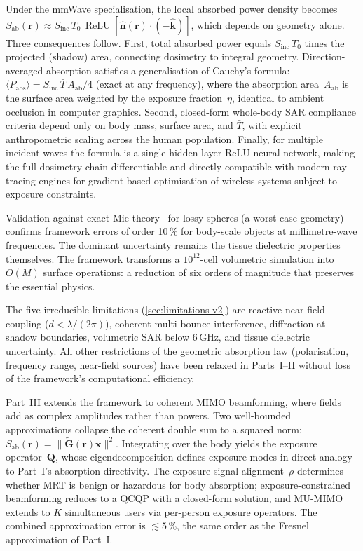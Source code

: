 \documentclass[11pt,a4paper]{article}
\theoremstyle{definition}      %
\newcommand{\khat}{\hat{\bm{k}}}
\newcommand{\nhat}{\hat{\bm{n}}}
\newcommand{\rr}{\mathbf{r}}
\newcommand{\Sinc}{S_{\mathrm{inc}}}
\newcommand{\Sab}{S_{\mathrm{ab}}}
\newcommand{\Aab}{A_{\mathrm{ab}}}
\DeclareMathOperator{\ReLU}{ReLU}
\newcommand{\Tbar}{\bar{T}}
\begin{document}
Under the mmWave specialisation, the local absorbed power density
becomes $\Sab(\rr)\approx\Sinc\,T_0\,\ReLU[\nhat(\rr)\cdot(-\khat)]$,
which depends on geometry alone.  Three consequences follow.
First, total absorbed power equals $\Sinc\,T_0$ times the projected
(shadow) area, connecting dosimetry to integral geometry.
Direction-averaged absorption satisfies a generalisation of Cauchy's
formula: $\langle P_{\mathrm{abs}}\rangle = \Sinc\,\Tbar\,\Aab/4$
(exact at any frequency), where the absorption area~$\Aab$ is the
surface area weighted by the exposure fraction~$\eta$, identical to
ambient occlusion in computer graphics.
Second, closed-form whole-body SAR compliance criteria depend only on
body mass, surface area, and $\Tbar$, with explicit anthropometric
scaling across the human population.
Finally, for multiple incident waves the formula is a
single-hidden-layer ReLU neural network, making the full dosimetry
chain differentiable and directly compatible with modern ray-tracing
engines for gradient-based optimisation of wireless systems subject
to exposure constraints.

Validation against exact Mie theory~\cite{BohrenHuffman1983} for
lossy spheres (a worst-case geometry) confirms framework errors of
order 10\,\% for body-scale objects at millimetre-wave frequencies.  The dominant uncertainty
remains the tissue dielectric properties themselves.  The framework
transforms a $10^{12}$-cell volumetric simulation into $O(M)$ surface
operations: a reduction of six orders of magnitude that preserves
the essential physics.

The five irreducible limitations (\cref{sec:limitations-v2}) are
reactive near-field coupling ($d < \lambda/(2\pi)$), coherent
multi-bounce interference, diffraction at shadow boundaries,
volumetric SAR below 6\,GHz, and tissue dielectric uncertainty.
All other restrictions of the geometric absorption law
(polarisation, frequency range, near-field sources) have been
relaxed in Parts~I--II without loss of the framework's computational
efficiency.

Part~III extends the framework to coherent MIMO beamforming,
where fields add as complex amplitudes rather than powers.  Two
well-bounded approximations collapse the coherent double sum to a
squared norm: $\Sab(\rr) =
\|\tilde{\mathbf{G}}(\rr)\mathbf{x}\|^2$.  Integrating over
the body yields the exposure operator~$\mathbf{Q}$, whose
eigendecomposition defines exposure modes in direct analogy to
Part~I's absorption directivity.  The exposure-signal
alignment~$\rho$ determines whether MRT is benign or hazardous for
body absorption; exposure-constrained beamforming reduces to a QCQP
with a closed-form solution, and MU-MIMO extends to $K$ simultaneous
users via per-person exposure operators.  The combined approximation
error is $\lesssim 5\,\%$, the same order as the Fresnel approximation
of Part~I.
\end{document}
